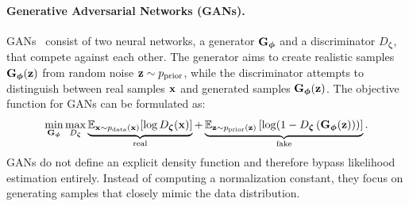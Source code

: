 






\paragraph{Generative Adversarial Networks (GANs).}
GANs~\citep{goodfellow2014generative} consist of two neural networks, a generator $ {\mathbf{G}}_{\bm{\phi}} $ and a discriminator $ D_{\bm{\zeta}} $, that compete against each other. The generator aims to create realistic samples $ {\mathbf{G}}_{\bm{\phi}}({\mathbf{z}}) $ from random noise $ {\mathbf{z}} \sim p_{\mathrm{prior}}$, while the discriminator attempts to distinguish between real samples $ {\mathbf{x}} $ and generated samples $ {\mathbf{G}}_{\bm{\phi}}({\mathbf{z}}) $. The objective function for GANs can be formulated as:
\begin{equation*}
    \min_{{\mathbf{G}}_{\bm{\phi}}} \max_{D_{\bm{\zeta}}} \underbrace{\mathbb{E}_{{\mathbf{x}} \sim p_{\mathrm{data}}({\mathbf{x}})}[\log D_{\bm{\zeta}}({\mathbf{x}})]}_{\text{real}} + \underbrace{\mathbb{E}_{{\mathbf{z}} \sim p_{\mathrm{prior}}({\mathbf{z}})}\left[\log(1 - D_{\bm{\zeta}}\left({\mathbf{G}}_{\bm{\phi}}({\mathbf{z}}))\right)\right]}_{\text{fake}}.
\end{equation*}
GANs do not define an explicit density function and therefore bypass likelihood estimation entirely. 
Instead of computing a normalization constant, they focus on generating samples that closely mimic the data distribution. 

